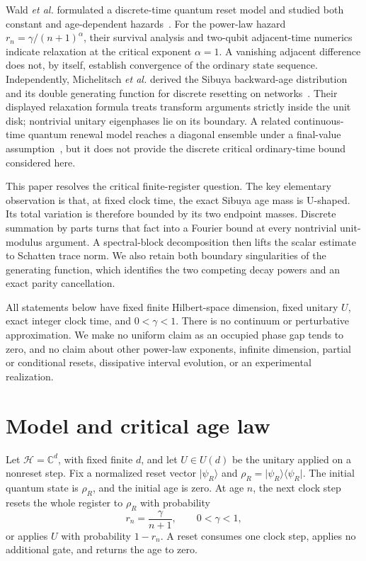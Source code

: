 \documentclass[aps,pra,reprint,superscriptaddress,longbibliography,nofootinbib]{revtex4-2}
\newcommand{\cH}{\mathcal H}
\begin{document}
Wald \emph{et al.} formulated a discrete-time quantum reset model and studied
both constant and age-dependent hazards~\cite{Wald2025}.  For the power-law
hazard $r_n=\gamma/(n+1)^\alpha$, their survival analysis and two-qubit
adjacent-time numerics indicate relaxation at the critical exponent
$\alpha=1$.  A vanishing adjacent difference does not, by itself, establish
convergence of the ordinary state sequence.  Independently, Michelitsch
\emph{et al.} derived the Sibuya backward-age distribution and its double
generating function for discrete resetting on networks~\cite{Michelitsch2025}.
Their displayed relaxation formula treats transform arguments strictly inside
the unit disk; nontrivial unitary eigenphases lie on its boundary.  A related
continuous-time quantum renewal model reaches a diagonal ensemble under a
final-value assumption~\cite{Sevilla2023}, but it does not provide the
discrete critical ordinary-time bound considered here.

This paper resolves the critical finite-register question.  The key elementary
observation is that, at fixed clock time, the exact Sibuya age mass is
U-shaped.  Its total variation is therefore bounded by its two endpoint
masses.  Discrete summation by parts turns that fact into a Fourier bound at
every nontrivial unit-modulus argument.  A spectral-block decomposition then
lifts the scalar estimate to Schatten trace norm.  We also retain both
boundary singularities of the generating function, which identifies the two
competing decay powers and an exact parity cancellation.

All statements below have fixed finite Hilbert-space dimension, fixed unitary
$U$, exact integer clock time, and $0<\gamma<1$.  There is no continuum or
perturbative approximation.  We make no uniform claim as an occupied phase
gap tends to zero, and no claim about other power-law exponents, infinite
dimension, partial or conditional resets, dissipative interval evolution, or
an experimental realization.

\section{Model and critical age law}
\label{sec:model}

Let $\cH=\mathbb C^d$, with fixed finite $d$, and let $U\in U(d)$ be the
unitary applied on a nonreset step.  Fix a normalized reset vector
$\lvert\psi_R\rangle$ and
$\rho_R=\lvert\psi_R\rangle\langle\psi_R\rvert$.  The initial quantum state
is $\rho_R$, and the initial age is zero.  At age $n$, the next clock step
resets the whole register to $\rho_R$ with probability
\begin{equation}
 r_n=\frac{\gamma}{n+1},\qquad 0<\gamma<1,
 \label{eq:hazard}
\end{equation}
or applies $U$ with probability $1-r_n$.  A reset consumes one clock step,
applies no additional gate, and returns the age to zero.
\end{document}
